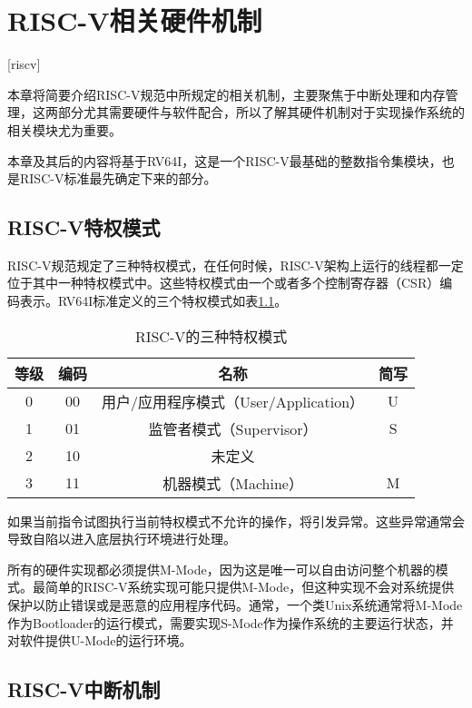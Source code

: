 
\chapter{RISC-V相关硬件机制}[riscv]
\label{chapter:riscv}

本章将简要介绍RISC-V规范中所规定的相关机制，主要聚焦于中断处理和内存管理，这两部分尤其需要硬件与软件配合，所以了解其硬件机制对于实现操作系统的相关模块尤为重要。

本章及其后的内容将基于RV64I，这是一个RISC-V最基础的整数指令集模块，也是RISC-V标准最先确定下来的部分。

\section{RISC-V特权模式}

RISC-V规范规定了三种特权模式，在任何时候，RISC-V架构上运行的线程都一定位于其中一种特权模式中。这些特权模式由一个或者多个控制寄存器（CSR）编码表示。RV64I标准定义的三个特权模式如表\ref{tab:privilege}。

\begin{table}[h]
	\centering
	\setlength{\belowcaptionskip}{2pt}
	\caption{RISC-V的三种特权模式}
	\label{tab:privilege}
	\begin{tabular}{|c|c|c|c|}
		\hline
		等级 & 编码 & 名称                          & 简写 \\ \hline
		0  & 00 & 用户/应用程序模式（User/Application） & U  \\ \hline
		1  & 01 & 监管者模式（Supervisor）           & S  \\ \hline
		2  & 10 & 未定义                         &    \\ \hline
		3  & 11 & 机器模式（Machine）               & M  \\ \hline
	\end{tabular}
\end{table}

如果当前指令试图执行当前特权模式不允许的操作，将引发异常。这些异常通常会导致自陷以进入底层执行环境进行处理。

所有的硬件实现都必须提供M-Mode，因为这是唯一可以自由访问整个机器的模式。最简单的RISC-V系统实现可能只提供M-Mode，但这种实现不会对系统提供保护以防止错误或是恶意的应用程序代码。通常，一个类Unix系统通常将M-Mode作为Bootloader的运行模式，需要实现S-Mode作为操作系统的主要运行状态，并对软件提供U-Mode的运行环境。

\section{RISC-V中断机制}
\label{sec:interrupt}

